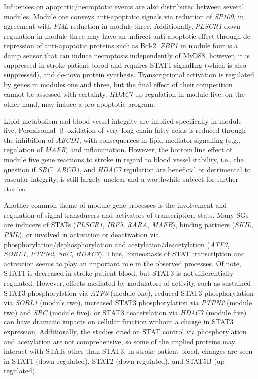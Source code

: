 Influences on apoptotic/necroptotic events are also distributed between several modules. Module one conveys anti-apoptotic signals via reduction of \emph{SP100}, in agreement with \emph{PML} reduction in module three. Additionally, \emph{PLSCR1} down-regulation in module three may have an indirect anti-apoptotic effect through de-repression of anti-apoptotic proteins such as Bcl-2. \emph{ZBP1} in module four is a \ac{damp} sensor that can induce necroptosis independently of MyD88, however, it is suppressed in stroke patient blood and requires STAT1 signalling (which is also suppressed), and de-novo protein synthesis. Transcriptional activation is regulated by genes in modules one and three, but the final effect of their competition cannot be assessed with certainty. \emph{HDAC7} up-regulation in module five, on the other hand, may induce a pro-apoptotic program.

Lipid metabolism and blood vessel integrity are implied specifically in module five. Peroxisomal $\upbeta$-oxidation of very long chain fatty acids is reduced through the inhibition of \emph{ABCD1}, with consequences in lipid mediator signalling (e.g., regulation of \emph{MAFB}) and inflammation. However, the bottom line effect of module five gene reactions to stroke in regard to blood vessel stability, i.e., the question if \emph{SRC}, \emph{ABCD1}, and \emph{HDAC7} regulation are beneficial or detrimental to vascular integrity, is still largely unclear and a worthwhile subject for further studies.

Another common theme of module gene processes is the involvement and regulation of signal transducers and activators of transcription, \acp{stat}. Many SGs are inducers of STATs (\emph{PLSCR1}, \emph{IRF5}, \emph{RARA}, \emph{MAFB}), binding partners (\emph{SKIL}, \emph{PML}), or involved in activation or deactivation via phosphorylation/dephosphorylation and acetylation/deacetylation (\emph{ATF3}, \emph{SORL1}, \emph{PTPN2}, \emph{SRC}, \emph{HDAC7}). Thus, homeostasis of STAT transcription and activation seems to play an important role in the observed processes. Of note, STAT1 is decreased in stroke patient blood, but STAT3 is not differentially regulated. However, effects mediated by modulators of activity, such as sustained STAT3 phosphorylation via \emph{ATF3} (module one), reduced STAT3 phosphorylation via \emph{SORL1} (module two), increased STAT3 phosphorylation via \emph{PTPN2} (module two) and \emph{SRC} (module five), or STAT3 deacetylation via \emph{HDAC7} (module five) can have dramatic impacts on cellular function without a change in STAT3 expression. Additionally, the studies cited on STAT control via phosphorylation and acetylation are not comprehensive, so some of the implied proteins may interact with STATs other than STAT3. In stroke patient blood, changes are seen in STAT1 (down-regulated), STAT2 (down-regulated), and STAT5B (up-regulated).

